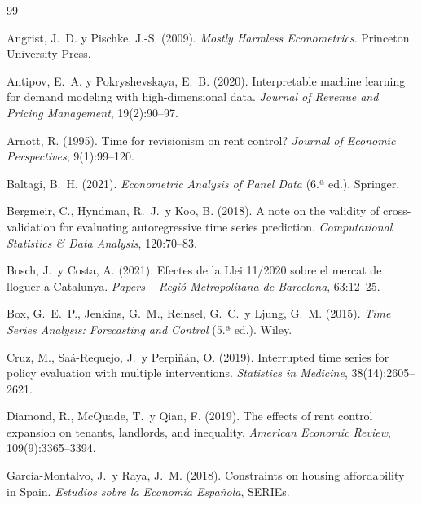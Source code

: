 \documentclass[10pt,a4paper,twocolumn]{article}
\begin{document}

\begin{thebibliography}{99}

Angrist, J.~D. y Pischke, J.-S. (2009).
\textit{Mostly Harmless Econometrics}.
Princeton University Press.

Antipov, E.~A. y Pokryshevskaya, E.~B. (2020).
Interpretable machine learning for demand modeling with high-dimensional data.
\textit{Journal of Revenue and Pricing Management}, 19(2):90--97.

Arnott, R. (1995).
Time for revisionism on rent control?
\textit{Journal of Economic Perspectives}, 9(1):99--120.

Baltagi, B.~H. (2021).
\textit{Econometric Analysis of Panel Data} (6.ª ed.).
Springer.

Bergmeir, C., Hyndman, R.~J.\ y Koo, B. (2018).
A note on the validity of cross-validation for evaluating autoregressive time
series prediction.
\textit{Computational Statistics \& Data Analysis}, 120:70--83.

Bosch, J.\ y Costa, A. (2021).
Efectes de la Llei 11/2020 sobre el mercat de lloguer a Catalunya.
\textit{Papers -- Regió Metropolitana de Barcelona}, 63:12--25.

Box, G.~E.~P., Jenkins, G.~M., Reinsel, G.~C.\ y Ljung, G.~M. (2015).
\textit{Time Series Analysis: Forecasting and Control} (5.ª ed.).
Wiley.

Cruz, M., Saá-Requejo, J.\ y Perpiñán, O. (2019).
Interrupted time series for policy evaluation with multiple interventions.
\textit{Statistics in Medicine}, 38(14):2605--2621.

Diamond, R., McQuade, T.\ y Qian, F. (2019).
The effects of rent control expansion on tenants, landlords, and inequality.
\textit{American Economic Review}, 109(9):3365--3394.

García-Montalvo, J.\ y Raya, J.~M. (2018).
Constraints on housing affordability in Spain.
\textit{Estudios sobre la Economía Española}, SERIEs.


\end{thebibliography}
\end{document}
